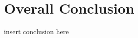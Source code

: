 \graphicspath{{chapt_dutch/}{intro/}{chapt2/}{chapt3/}{chapt4/}}

\renewcommand\evenpagerightmark{{\scshape\small Conclusion}}
\renewcommand\oddpageleftmark{{\scshape\small Conclusion}}

\hyphenation{}

\chapter[Overall Conclusion]%
{Overall Conclusion}

insert conclusion here


\clearpage{\pagestyle{empty}\cleardoublepage}
